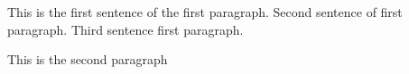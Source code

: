 \documentclass[12pt]{article}
\begin{document}
This is the first sentence of the first paragraph. Second sentence of first paragraph.
Third sentence first paragraph.

This is the second paragraph
\end{document}
